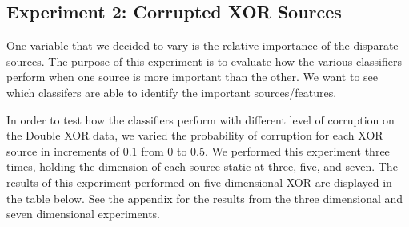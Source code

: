 \documentclass{article}
\begin{document}
\subsection*{Experiment 2: Corrupted XOR Sources}

One variable that we decided to vary is the relative importance of the disparate sources. The purpose of this experiment is to evaluate how the various classifiers perform when one source is more important than the other. We want to see which classifers are able to identify the important sources/features.

In order to test how the classifiers perform with different level of corruption on the Double XOR data, we varied the probability of corruption for each XOR source in increments of 0.1 from 0 to 0.5. We performed this experiment three times, holding the dimension of each source static at three, five, and seven. The results of this experiment performed on five dimensional XOR are displayed in the table below. See the appendix for the results from the three dimensional and seven dimensional experiments.
\end{document}
